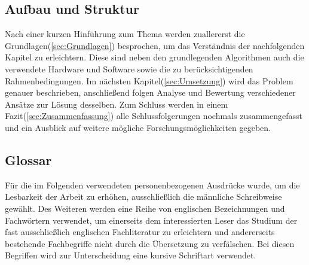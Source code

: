 \subsection{Aufbau und Struktur}
Nach einer kurzen Hinführung zum Thema werden zuallererst die Grundlagen(\ref{sec:Grundlagen}) besprochen, um das Verständnis der nachfolgenden Kapitel zu erleichtern. Diese sind neben den grundlegenden Algorithmen auch die verwendete Hardware und Software sowie die zu berücksichtigenden Rahmenbedingungen. Im nächsten Kapitel(\ref{sec:Umsetzung}) wird das Problem genauer beschrieben, anschließend folgen Analyse und Bewertung verschiedener Ansätze zur Lösung desselben. Zum Schluss werden in einem Fazit(\ref{sec:Zusammenfassung}) alle Schlussfolgerungen nochmals zusammengefasst und ein Ausblick auf weitere mögliche Forschungsmöglichkeiten gegeben. \\ 


\subsection{Glossar}
Für die im Folgenden verwendeten personenbezogenen
Ausdrücke wurde, um die Lesbarkeit der Arbeit zu erhöhen,
ausschließlich die männliche Schreibweise gewählt. Des Weiteren werden eine
Reihe von englischen Bezeichnungen und Fachwörtern verwendet, um einerseits dem
interessierten Leser das Studium der fast ausschließlich englischen
Fachliteratur zu erleichtern und andererseits bestehende Fachbegriffe nicht durch die Übersetzung zu verfälschen. Bei diesen Begriffen wird zur Unterscheidung eine kursive Schriftart verwendet.

